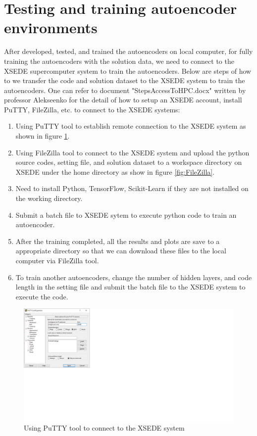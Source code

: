 \documentclass{article}
\begin{document}
\section{Testing and training autoencoder environments} 
After developed, tested, and trained the autoencoders on local computer, for fully training the autoencoders with the solution data, we need to connect to the XSEDE supercomputer system to train the autoencoders. Below are steps of how to we transfer the code and solution dataset to the XSEDE system to train the autoencoders. One can refer to document "StepsAccessToHPC.docx" written by professor Alekseenko for the detail of how to setup an XSEDE account, install PuTTY, FileZilla, etc. to connect to the XSEDE systems:
\begin{enumerate}
	\item Using PuTTY tool to establish remote connection to the XSEDE system as shown in figure \ref{fig:PuTTY}.
	\item Using FileZilla tool to connect to the XSEDE system and upload the python source codes, setting file, and solution dataset to a workspace directory on XSEDE under the home directory as show in figure \ref{fig:FileZilla}.
	\item Need to install Python, TensorFlow, Scikit-Learn if they are not installed on the working directory.
	\item Submit a batch file to XSEDE sytem to execute python code to train an autoencoder.
	\item After the training completed, all the results and plots are save to a appropriate directory so that we can download these files to the local computer via FileZilla tool.
	\item To train another autoencoders, change the number of hidden layers, and code length in the setting file and submit the batch file to the XSEDE system to execute the code.
\end{enumerate}
\begin{figure}[h!]
	\centering
	\includegraphics[width=1\textwidth]{PuTTY.png}
	\caption{Using PuTTY tool to connect to the XSEDE system }
	\label{fig:PuTTY}
\end{figure}
\end{document}
